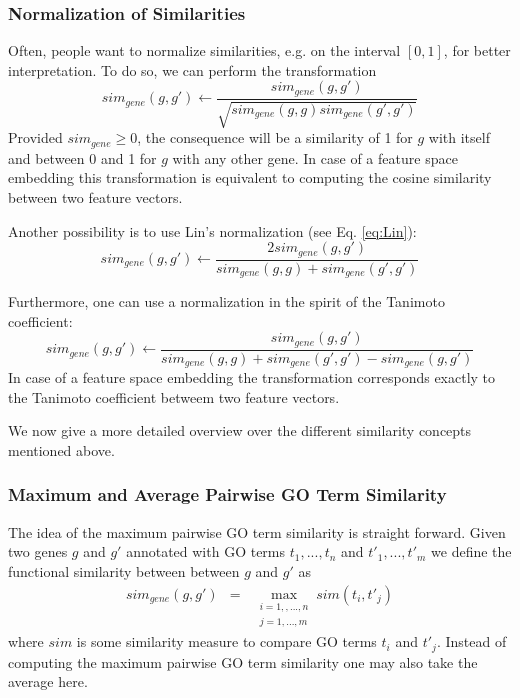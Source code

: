 \documentclass[12pt,a4paper]{article}
\begin{document}
\subsubsection{Normalization of Similarities}

Often, people want to normalize similarities, e.g. on the interval $[0, 1]$, for better interpretation. To do so, we can perform the transformation
\begin{equation}
sim_{gene}(g,g')\leftarrow\frac{sim_{gene}(g,g')}{\sqrt{sim_{gene}(g,g)sim_{gene}(g',g')}}\label{eq:normalize}
\end{equation}
Provided $sim_{gene} \geq 0$, the consequence will be a similarity of 1 for $g$ with itself and between 0 and 1 for $g$ with any other gene. In case of a feature space embedding this transformation is equivalent to computing the cosine similarity between two feature vectors.

Another possibility is to use Lin's normalization (see Eq. \ref{eq:Lin}):
\begin{equation}
sim_{gene}(g,g')\leftarrow\frac{2sim_{gene}(g,g')}{sim_{gene}(g,g)+sim_{gene}(g',g')}\label{eq:normalize2}
\end{equation}

Furthermore, one can use a normalization in the spirit of the Tanimoto coefficient:
\begin{equation}
sim_{gene}(g,g')\leftarrow\frac{sim_{gene}(g,g')}{sim_{gene}(g,g)+sim_{gene}(g',g')-sim_{gene}(g,g')}\label{eq:normalize3}
\end{equation}
In case of a feature space embedding the transformation corresponds exactly to the Tanimoto coefficient betweem two feature vectors.

We now give a more detailed overview over the different similarity concepts mentioned above.

\subsubsection{Maximum and Average Pairwise GO Term Similarity}

The idea of the maximum pairwise GO term similarity is straight forward. Given two genes $g$ and $g'$ annotated with GO terms $t_{1},...,t_{n}$ and $t'_{1},...,t'_{m}$ we define the functional similarity between between $g$ and $g'$ as
\begin{eqnarray}
sim_{gene}(g,g') & = & \max_{\begin{array}{c}
i=1,,...,n\\
j=1,...,m\end{array}}sim(t_{i},t'_{j})
\end{eqnarray}
where $sim$ is some similarity measure to compare GO terms $t_i$ and $t'_j$.
Instead of computing the maximum pairwise GO term similarity one may also take the average here.
\end{document}
